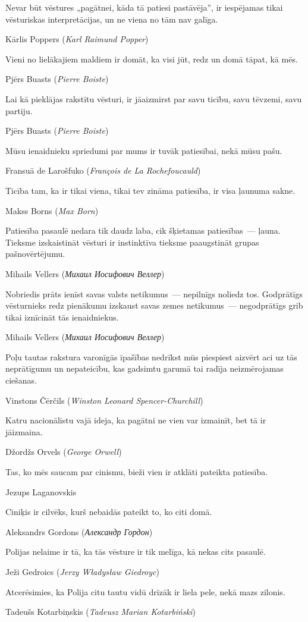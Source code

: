 \documentclass[twoside,a5paper,12pt,fleqn,openany]{extbook}
\newcommand{\pltxti}[1]{\textit{\textpolish{#1}}}
\newcommand{\rutxti}[1]{\textit{\textrussian{#1}}}
\newcommand{\frtxti}[1]{\textit{\textfrench{#1}}}
\newcommand{\entxti}[1]{\textit{\textenglish{#1}}}
\begin{document}
\epigraph
{Nevar būt vēstures „pagātnei, kāda tā patiesi pastāvēja”, ir iespējamas tikai vēsturiskas interpretācijas, un ne viena no tām nav galīga.}
{Kārlis Poppers (\entxti{Karl Raimund Popper})}

\epigraph
{Vieni no lielākajiem maldiem ir domāt, ka visi jūt, redz un domā tāpat, kā mēs.}
{Pjērs Buasts (\frtxti{Pierre Boiste})}

\epigraph
{Lai kā pieklājas rakstītu vēsturi, ir jāaizmirst par savu ticību, savu tēvzemi, savu partiju.}
{Pjērs Buasts (\frtxti{Pierre Boiste})}

\newpage

\epigraph
{Mūsu ienaidnieku spriedumi par mums ir tuvāk patiesībai, nekā mūsu pašu.}
{Fransuā de Larošfuko (\frtxti{François de La Rochefoucauld})}

\epigraph
{Ticība tam, ka ir tikai viena, tikai tev zināma patiesība, ir visa ļaunuma sakne.}
{Makss Borns (\entxti{Max Born})}

\epigraph
{Patiesība pasaulē nedara tik daudz laba, cik šķietamas patiesības~--- ļauna. Tieksme izskaistināt vēsturi ir instinktīva tieksme paaugstināt grupas pašnovērtējumu.}
{Mihails Vellers (\rutxti{Михаил Иосифович Веллер})}

\epigraph
{Nobriedis prāts ienīst savas valsts netikumus~--- nepilnīgs noliedz tos. Godprātīgs vēsturnieks redz pienākumu izskaust savas zemes netikumus~--- negodprātīgs grib tikai iznīcināt tās ienaidniekus.}
{Mihails Vellers (\rutxti{Михаил Иосифович Веллер})}

\epigraph
{Poļu tautas rakstura varonīgās īpašības nedrīkst mūs piespiest aizvērt aci uz tās neprātīgumu un nepateicību, kas gadsimtu garumā tai radīja neizmērojamas ciešanas.}
{Vinstons Čērčils (\entxti{Winston Leonard Spencer-Churchill})}

\newpage

\epigraph
{Katru nacionālistu vajā ideja, ka pagātni ne vien var izmainīt, bet tā ir jāizmaina.}
{Džordžs Orvels (\entxti{George Orwell})}

\epigraph
{Tas, ko mēs saucam par cinismu, bieži vien ir atklāti pateikta patiesība.}
{Jezups Laganovskis}

\epigraph
{Ciniķis ir cilvēks, kurš nebaidās pateikt to, ko citi domā.}
{Aleksandrs Gordons (\rutxti{Александр Гордон})}

\epigraph
{Polijas nelaime ir tā, ka tās vēsture ir tik melīga, kā nekas cits pasaulē.}
{Ježi Gedroics (\pltxti{Jerzy Władysław Giedroyc})}

\epigraph
{Atcerēsimies, ka Polija citu tautu vidū drīzāk ir liela pele, nekā mazs zilonis.}
{Tadeušs Kotarbiņskis (\pltxti{Tadeusz Marian Kotarbiński})}
\end{document}
